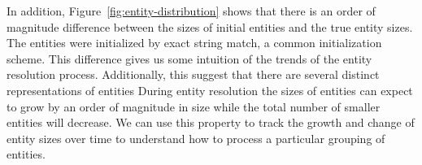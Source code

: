 In addition, Figure~\ref{fig:entity-distribution} shows that there is an
order of magnitude difference between the sizes of initial entities and the
true entity sizes.
The entities were initialized by exact string match, a common initialization scheme.
This difference gives us some intuition of the trends of the entity resolution process.
Additionally, this suggest that there are several distinct representations
of entities
During entity resolution the sizes of entities can expect to grow 
by an order of magnitude in size while the total number of smaller entities will decrease.
We can use this property to track the growth and change of entity sizes over
time to understand how to process a particular grouping of entities. 



